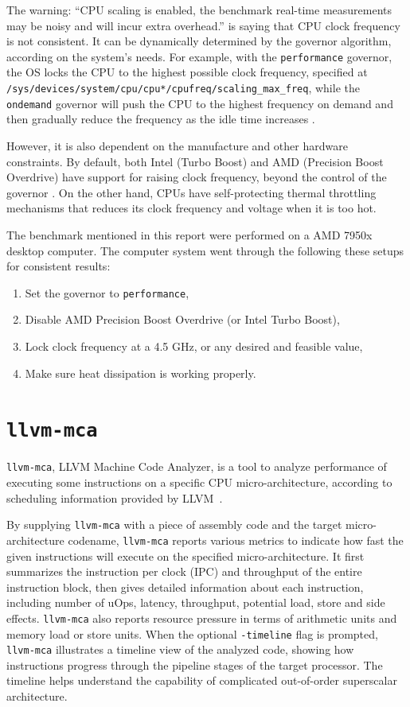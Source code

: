 \documentclass[logo,bsc,singlespacing,parskip]{infthesis}
\newcommand{\mca}{\texttt{llvm-mca}}
\newenvironment{compactlist}
{ \begin{enumerate}
    \setlength{\itemsep}{0pt}
    \setlength{\parskip}{0pt}
    \setlength{\parsep}{0pt}     
}
{ \end{enumerate} }
\begin{document}
The warning: ``CPU scaling is enabled, the benchmark real-time measurements may
be noisy and will incur extra overhead.'' is saying that CPU clock frequency is
not consistent. It can be dynamically determined by the governor algorithm,
according on the system's needs. For example, with the \texttt{performance}
governor, the OS locks the CPU to the highest possible clock frequency,
specified at \texttt{/sys/devices/system/cpu/cpu*/cpufreq/scaling\_max\_freq},
while the \texttt{ondemand} governor will push the CPU to the highest frequency
on demand and then gradually reduce the frequency as the idle time increases
\cite{archLinuxFreqScal}.

However, it is also dependent on the manufacture and other hardware constraints.
By default, both Intel (Turbo Boost) and AMD (Precision Boost Overdrive) have
support for raising clock frequency, beyond the control of the governor
\cite{GoogleBenchReduceVariance}. On the other hand, CPUs have self-protecting
thermal throttling mechanisms that reduces its clock frequency and voltage when
it is too hot. 

The benchmark mentioned in this report were performed on a AMD 7950x desktop
computer. The computer system went through the following these setups for
consistent results:
\begin{compactlist}
    \item Set the governor to \texttt{performance}, 
    \item Disable AMD Precision Boost Overdrive (or Intel Turbo Boost), 
    \item Lock clock frequency at a 4.5 GHz, or any desired and feasible value,
    \item Make sure heat dissipation is working properly.
\end{compactlist}



\section{\mca{}}

\mca{}, LLVM Machine Code Analyzer, is a tool to analyze performance of executing
some instructions on a specific CPU micro-architecture, according to scheduling
information provided by LLVM~\cite{llvm-mca}. 

By supplying \mca{} with a piece of assembly code and the target
micro-architecture codename, \mca{} reports various metrics to indicate how fast
the given instructions will execute on the specified micro-architecture. It
first summarizes the instruction per clock (IPC) and throughput of the entire
instruction block, then gives detailed information about each instruction,
including number of uOps, latency, throughput, potential load, store and side
effects. \mca{} also reports resource pressure in terms of arithmetic units and
memory load or store units. When the optional \texttt{-timeline} flag is
prompted, \mca{} illustrates a timeline view of the analyzed code, showing how
instructions progress through the pipeline stages of the target processor. The
timeline helps understand the capability of complicated out-of-order superscalar
architecture. 
\end{document}
